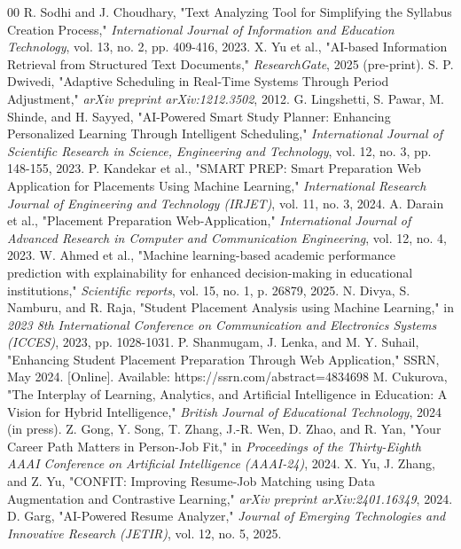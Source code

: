 \documentclass[conference]{IEEEtran}
\begin{document}
\begin{thebibliography}{00}
 R. Sodhi and J. Choudhary, "Text Analyzing Tool for Simplifying the Syllabus Creation Process," \textit{International Journal of Information and Education Technology}, vol. 13, no. 2, pp. 409-416, 2023.
 X. Yu et al., "AI-based Information Retrieval from Structured Text Documents," \textit{ResearchGate}, 2025 (pre-print).
 S. P. Dwivedi, "Adaptive Scheduling in Real-Time Systems Through Period Adjustment," \textit{arXiv preprint arXiv:1212.3502}, 2012.
 G. Lingshetti, S. Pawar, M. Shinde, and H. Sayyed, "AI-Powered Smart Study Planner: Enhancing Personalized Learning Through Intelligent Scheduling," \textit{International Journal of Scientific Research in Science, Engineering and Technology}, vol. 12, no. 3, pp. 148-155, 2023.
 P. Kandekar et al., "SMART PREP: Smart Preparation Web Application for Placements Using Machine Learning," \textit{International Research Journal of Engineering and Technology (IRJET)}, vol. 11, no. 3, 2024.
 A. Darain et al., "Placement Preparation Web-Application," \textit{International Journal of Advanced Research in Computer and Communication Engineering}, vol. 12, no. 4, 2023.
 W. Ahmed et al., "Machine learning-based academic performance prediction with explainability for enhanced decision-making in educational institutions," \textit{Scientific reports}, vol. 15, no. 1, p. 26879, 2025.
 N. Divya, S. Namburu, and R. Raja, "Student Placement Analysis using Machine Learning," in \textit{2023 8th International Conference on Communication and Electronics Systems (ICCES)}, 2023, pp. 1028-1031.
 P. Shanmugam, J. Lenka, and M. Y. Suhail, "Enhancing Student Placement Preparation Through Web Application," SSRN, May 2024. [Online]. Available: https://ssrn.com/abstract=4834698
 M. Cukurova, "The Interplay of Learning, Analytics, and Artificial Intelligence in Education: A Vision for Hybrid Intelligence," \textit{British Journal of Educational Technology}, 2024 (in press).
 Z. Gong, Y. Song, T. Zhang, J.-R. Wen, D. Zhao, and R. Yan, "Your Career Path Matters in Person-Job Fit," in \textit{Proceedings of the Thirty-Eighth AAAI Conference on Artificial Intelligence (AAAI-24)}, 2024.
 X. Yu, J. Zhang, and Z. Yu, "CONFIT: Improving Resume-Job Matching using Data Augmentation and Contrastive Learning," \textit{arXiv preprint arXiv:2401.16349}, 2024.
 D. Garg, "AI-Powered Resume Analyzer," \textit{Journal of Emerging Technologies and Innovative Research (JETIR)}, vol. 12, no. 5, 2025.

\end{thebibliography}
\end{document}
